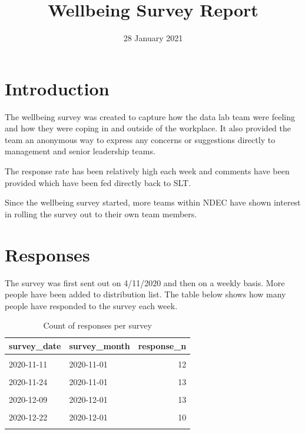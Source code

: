 \documentclass[
  10pt,
]{article}
\title{Wellbeing Survey Report}
\author{}
\date{\vspace{-2.5em}28 January 2021}
\begin{document}
\maketitle

{
\setcounter{tocdepth}{3}
\tableofcontents
}
\newpage

\hypertarget{introduction}{%
\section{Introduction}\label{introduction}}

The wellbeing survey was created to capture how the data lab team were
feeling and how they were coping in and outside of the workplace. It
also provided the team an anonymous way to express any concerns or
suggestions directly to management and senior leadership teams.

The response rate has been relatively high each week and comments have
been provided which have been fed directly back to SLT.

Since the wellbeing survey started, more teams within NDEC have shown
interest in rolling the survey out to their own team members.

\hypertarget{responses}{%
\section{Responses}\label{responses}}

The survey was first sent out on 4/11/2020 and then on a weekly basis.
More people have been added to distribution list. The table below shows
how many people have responded to the survey each week.

\begin{table}[H]

\caption{\label{tab:responses}Count of responses per survey}
\centering
\fontsize{12}{14}\selectfont
\begin{tabular}[t]{|>{}l||>{}l|r}
\toprule
survey\_date & survey\_month & response\_n\\
\midrule
\cellcolor{gray!6}{2020-11-04} & \cellcolor{gray!6}{2020-11-01} & \cellcolor{gray!6}{13}\\
2020-11-11 & 2020-11-01 & 12\\
\cellcolor{gray!6}{2020-11-18} & \cellcolor{gray!6}{2020-11-01} & \cellcolor{gray!6}{10}\\
2020-11-24 & 2020-11-01 & 13\\
\cellcolor{gray!6}{2020-12-02} & \cellcolor{gray!6}{2020-12-01} & \cellcolor{gray!6}{12}\\
2020-12-09 & 2020-12-01 & 13\\
\cellcolor{gray!6}{2020-12-16} & \cellcolor{gray!6}{2020-12-01} & \cellcolor{gray!6}{12}\\
2020-12-22 & 2020-12-01 & 10\\
\cellcolor{gray!6}{2020-12-30} & \cellcolor{gray!6}{2020-12-01} & \cellcolor{gray!6}{5}\\
\bottomrule
\end{tabular}
\end{table}
\end{document}
